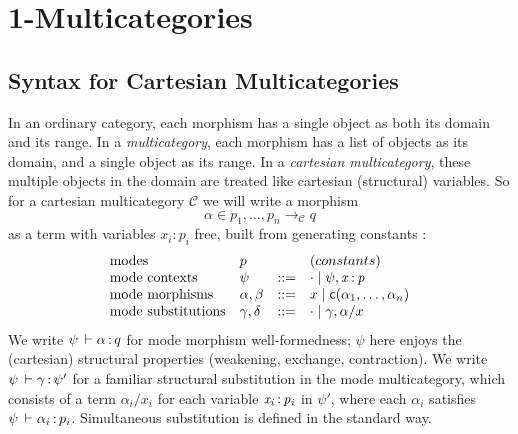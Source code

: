 
\newcommand\mor[3]{\ensuremath{#2} \longrightarrow_#1 #3}
\newcommand\C{\ensuremath{\mathcal{C}}}
\newcommand\D{\ensuremath{\mathcal{D}}}
\newcommand\E{\ensuremath{\mathcal{E}}}
\newcommand\deq{\ensuremath{\equiv}}
\newcommand\seq[3]{\ensuremath{#1 \vdash_{#2} #3}}
\newcommand\F[2]{\ensuremath{\dsd{F}_{#1}(#2)}}
\newcommand\U[3]{\ensuremath{\dsd{U}_{#1}(#2 \mid #3)}}
\newcommand\Fsymb[0]{\dsd{F}}
\newcommand\Usymb[0]{\dsd{U}}
\newcommand\tsubst[2]{\ensuremath{#1[#2]}}
\renewcommand\subst[3]{\ensuremath{#1[#2/#3]}}
\newcommand\wftype[2]{\ensuremath{#1 \: \dsd{type}_{#2}}}
\renewcommand\wfctx[2]{\ensuremath{#1 \: \dsd{ctx}_{#2}}}
\newcommand\modeof[1]{\ensuremath{\hat{#1}}}
\newcommand\many[1]{\ensuremath{\overline{#1}}}
\renewcommand{\oftp}[3]{\ensuremath{#1 \, \vdash #2 \, \dcd{:} \, #3}}


\section{1-Multicategories}

\subsection{Syntax for Cartesian Multicategories}
In an ordinary category, each morphism has a single object as both its
domain and its range.  In a \emph{multicategory}, each morphism has a
list of objects as its domain, and a single object as its range.  In a
\emph{cartesian multicategory}, these multiple objects in the domain are
treated like cartesian (structural) variables. So for a cartesian
multicategory \C\/ we will write a morphism
\[
\alpha \in \mor{\C}{p_1,\ldots,p_n}{q}
\]
as a term with variables $x_i:p_i$ free, built from generating constants
:
\[
\begin{array}{llll}
\text{modes} & p & & (constants) \\
\text{mode contexts} & \psi & ::= & \cdot \mid \psi,\mathit{x} \, \mathit{:} \, \mathit{p} \\
\text{mode morphisms} & \alpha,\beta & ::= & x \mid \mathsf{c}(\alpha_1,\ldots,\alpha_n) \\
\text{mode substitutions} & \gamma,\delta & ::= & \cdot \mid \gamma,\alpha/x\\
\end{array}
\]
We write $\oftp{\psi}{\alpha}{q}$ for mode morphism well-formedness;
$\psi$ here enjoys the (cartesian) structural properties (weakening,
exchange, contraction).  We write $\oftp{\psi}{\gamma}{\psi'}$ for a
familiar structural substitution in the mode multicategory, which
consists of a term $\alpha_i/x_i$ for each variable $\mathit{x_i} \, \mathit{:} \, \mathit{p_i}$ in
$\psi'$, where each $\alpha_i$ satisfies $\oftp{\psi}{\alpha_i}{p_i}$.
Simultaneous substitution is defined in the standard way.

